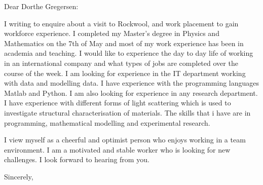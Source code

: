 \documentclass[10pt,a4paper]{letter}
\begin{document}
\begin{letter}{}
\opening{Dear Dorthe Gregersen:}

I writing to enquire about a visit to Rockwool, and work placement to gain workforce experience. I completed my Master's degree in Physics and Mathematics on the 7th of May and most of my work experience has been in academia and teaching. I would like to experience the day to day life of working in an international company and what types of jobs are completed over the course of the week. I am looking for experience in the IT department working with data and modelling data. I have experience with the programming languages Matlab and Python. I am also looking for experience in any research department. I have experience with different forms of light scattering which is used to investigate structural characterisation of materials. The skills that i have are in programming, mathematical modelling and experimental research.  

I view myself as a cheerful and optimist person who enjoys working in a team environment. I am a motivated and stable worker who is looking for new challenges. I look forward to hearing from you.

\closing{Sincerely,}

\end{letter}

\end{document}
